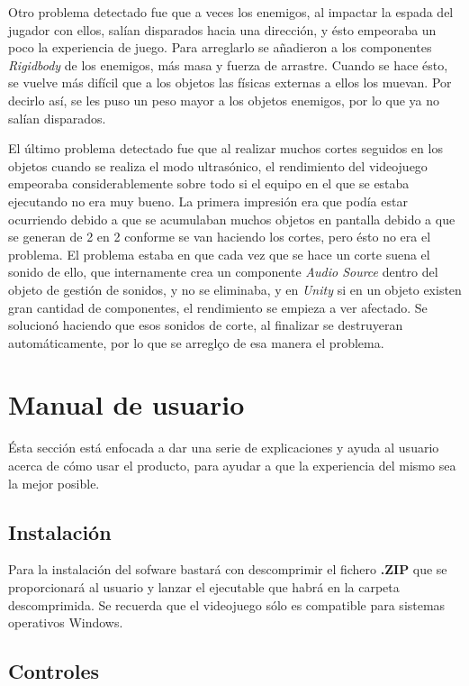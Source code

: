 Otro problema detectado fue que a veces los enemigos, al impactar la espada del jugador con ellos, salían disparados hacia una dirección, y ésto empeoraba un poco la experiencia de juego. Para arreglarlo se añadieron a los componentes \textit{Rigidbody} de los enemigos, más masa y fuerza de arrastre. Cuando se hace ésto, se vuelve más difícil que a los objetos las físicas externas a ellos los muevan. Por decirlo así, se les puso un peso mayor a los objetos enemigos, por lo que ya no salían disparados.

El último problema detectado fue que al realizar muchos cortes seguidos en los objetos cuando se realiza el modo ultrasónico, el rendimiento del videojuego empeoraba considerablemente sobre todo si el equipo en el que se estaba ejecutando no era muy bueno. La primera impresión era que podía estar ocurriendo debido a que se acumulaban muchos objetos en pantalla debido a que se generan de 2 en 2 conforme se van haciendo los cortes, pero ésto no era el problema. El problema estaba en que cada vez que se hace un corte suena el sonido de ello, que internamente crea un componente \textit{Audio Source} dentro del objeto de gestión de sonidos, y no se eliminaba, y en \textit{Unity} si en un objeto existen gran cantidad de componentes, el rendimiento se empieza a ver afectado. Se solucionó haciendo que esos sonidos de corte, al finalizar se destruyeran automáticamente, por lo que se arreglço de esa manera el problema.
\section{Manual de usuario}
\label{sec:manual}

Ésta sección está enfocada a dar una serie de explicaciones y ayuda al usuario acerca de cómo usar el producto, para ayudar a que la experiencia del mismo sea la mejor posible.

\subsection{Instalación}

Para la instalación del sofware bastará con descomprimir el fichero \textbf{.ZIP} que se proporcionará al usuario y lanzar el ejecutable que habrá en la carpeta descomprimida. Se recuerda que el videojuego sólo es compatible para sistemas operativos Windows.

\subsection{Controles}

